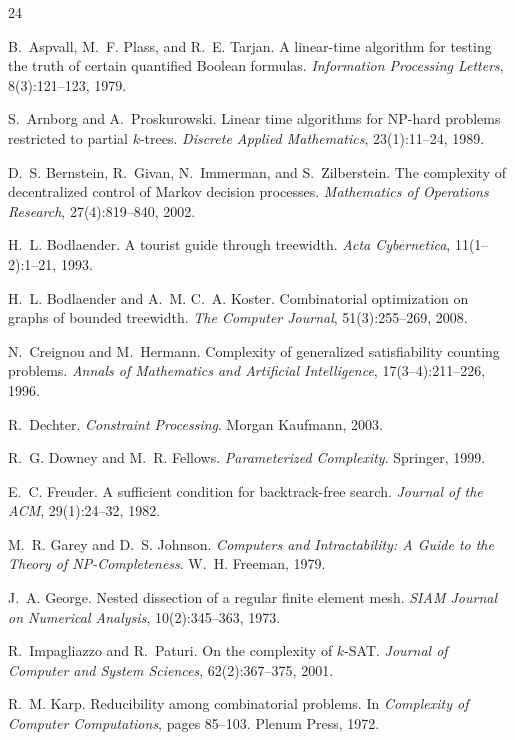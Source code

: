 \documentclass[11pt]{article}
\theoremstyle{plain}
\theoremstyle{definition}
\theoremstyle{remark}
\begin{document}
\begin{thebibliography}{24}

 B.~Aspvall, M.~F. Plass, and R.~E. Tarjan.
A linear-time algorithm for testing the truth of certain quantified Boolean
formulas. \emph{Information Processing Letters}, 8(3):121--123, 1979.

 S.~Arnborg and A.~Proskurowski.
Linear time algorithms for NP-hard problems restricted to partial $k$-trees.
\emph{Discrete Applied Mathematics}, 23(1):11--24, 1989.

 D.~S. Bernstein, R.~Givan, N.~Immerman, and
S.~Zilberstein. The complexity of decentralized control of Markov decision
processes. \emph{Mathematics of Operations Research}, 27(4):819--840, 2002.

 H.~L. Bodlaender.
A tourist guide through treewidth. \emph{Acta Cybernetica},
11(1--2):1--21, 1993.

 H.~L. Bodlaender and A.~M. C.~A. Koster.
Combinatorial optimization on graphs of bounded treewidth.
\emph{The Computer Journal}, 51(3):255--269, 2008.

 N.~Creignou and M.~Hermann.
Complexity of generalized satisfiability counting problems.
\emph{Annals of Mathematics and Artificial Intelligence}, 17(3--4):211--226,
1996.

 R.~Dechter. \emph{Constraint Processing}.
Morgan Kaufmann, 2003.

 R.~G. Downey and M.~R. Fellows.
\emph{Parameterized Complexity}. Springer, 1999.

 E.~C. Freuder. A sufficient condition for backtrack-free
search. \emph{Journal of the ACM}, 29(1):24--32, 1982.

 M.~R. Garey and D.~S. Johnson.
\emph{Computers and Intractability: A Guide to the Theory of
NP-Completeness}. W.~H. Freeman, 1979.

 J.~A. George. Nested dissection of a regular finite
element mesh. \emph{SIAM Journal on Numerical Analysis}, 10(2):345--363,
1973.

 R.~Impagliazzo and R.~Paturi.
On the complexity of $k$-SAT. \emph{Journal of Computer and System
Sciences}, 62(2):367--375, 2001.

 R.~M. Karp. Reducibility among combinatorial problems.
In \emph{Complexity of Computer Computations}, pages 85--103. Plenum Press,
1972.


\end{thebibliography}
\end{document}
